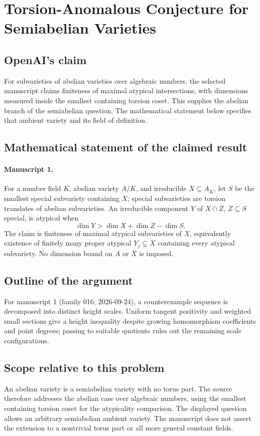 \documentclass[11pt]{article}
\begin{document}
\section*{Torsion-Anomalous Conjecture for Semiabelian Varieties}

\subsection{OpenAI's claim}
For subvarieties of abelian varieties over algebraic numbers, the selected manuscript claims finiteness of maximal atypical intersections, with dimensions measured inside the smallest containing torsion coset. This supplies the abelian branch of the semiabelian question. The mathematical statement below specifies that ambient variety and its field of definition.

\subsection{Mathematical statement of the claimed result}
\paragraph{Manuscript 1.}
For a number field $K$, abelian variety $A/K$, and irreducible $X\subseteq A_{\bar K}$, let $S$ be the smallest special subvariety containing $X$; special subvarieties are torsion translates of abelian subvarieties. An irreducible component $Y$ of $X\cap Z$, $Z\subseteq S$ special, is atypical when
\[
 \dim Y>\dim X+\dim Z-\dim S.
\]
The claim is finiteness of maximal atypical subvarieties of $X$, equivalently existence of finitely many proper atypical $Y_j\subsetneq X$ containing every atypical subvariety. No dimension bound on $A$ or $X$ is imposed.

\subsection{Outline of the argument}
For manuscript 1 (family 016; 2026-09-24), a counterexample sequence is decomposed into distinct height scales. Uniform tangent positivity and weighted small sections give a height inequality despite growing homomorphism coefficients and point degrees; passing to suitable quotients rules out the remaining scale configurations.

\subsection{Scope relative to this problem}
An abelian variety is a semiabelian variety with no torus part. The source therefore addresses the abelian case over algebraic numbers, using the smallest containing torsion coset for the atypicality comparison. The displayed question allows an arbitrary semiabelian ambient variety. The manuscript does not assert the extension to a nontrivial torus part or all more general constant fields.
\end{document}
